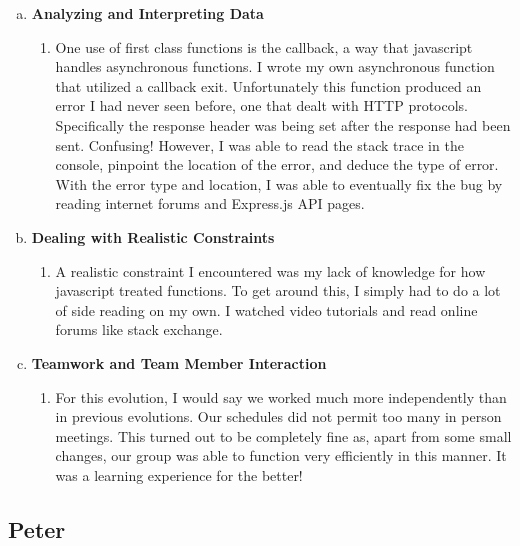 \documentclass[11pt]{article}   %
\begin{document}
\begin{enumerate} [a)]
\begin{enumerate} [$\cdot$]
\end{enumerate}	
\item  {\bf Analyzing and Interpreting Data}
\begin{enumerate} [$\cdot$]
\item One use of first class functions is the callback, a way that javascript handles asynchronous functions. I wrote my own asynchronous function that utilized a callback exit. Unfortunately this function produced an error I had never seen before, one that dealt with HTTP protocols. Specifically the response header was being set after the response had been sent. Confusing! However, I was able to read the stack trace in the console, pinpoint the location of the error, and deduce the type of error. With the error type and location, I was able to eventually fix the bug by reading internet forums and Express.js API pages.
\end{enumerate}
\item {\bf Dealing with Realistic Constraints}
\begin{enumerate} [$\cdot$]
\item A realistic constraint I encountered was my lack of knowledge for how javascript treated functions. To get around this, I simply had to do a lot of side reading on my own. I watched video tutorials and read online forums like stack exchange. 
\end{enumerate}
\item  {\bf Teamwork and Team Member Interaction}
\begin{enumerate} [$\cdot$]
\item For this evolution, I would say we worked much more independently than in previous evolutions. Our schedules did not permit too many in person meetings. This turned out to be completely fine as, apart from some small changes, our group was able to function very efficiently in this manner. It was a learning experience for the better!
\end{enumerate}
\end{enumerate}

\subsection*{Peter}
\end{document}
